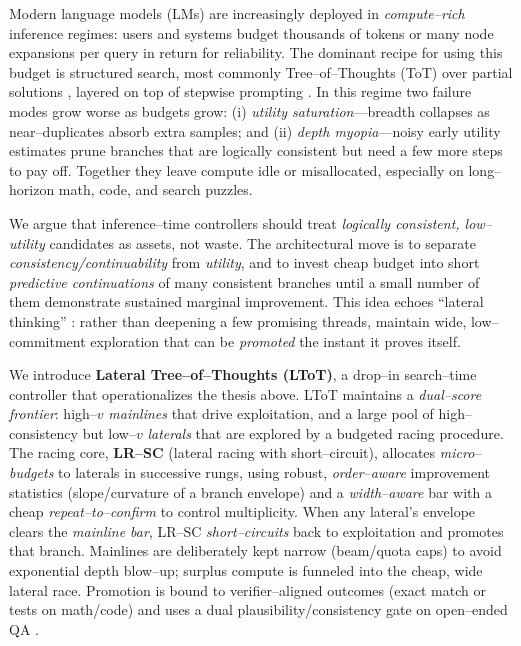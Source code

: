 \documentclass{article}
\begin{document}
Modern language models (LMs) are increasingly deployed in \emph{compute--rich} inference regimes: users and systems budget thousands of tokens or many node expansions per query in return for reliability.
The dominant recipe for using this budget is structured search, most commonly Tree--of--Thoughts (ToT) over partial solutions \citep{yao2023tot}, layered on top of stepwise prompting \citep{wei2022cot,wang2022selfconsistency,kojima2022zeroshotcot}.
In this regime two failure modes grow worse as budgets grow:
(i) \emph{utility saturation}—breadth collapses as near--duplicates absorb extra samples; and
(ii) \emph{depth myopia}—noisy early utility estimates prune branches that are logically consistent but need a few more steps to pay off.
Together they leave compute idle or misallocated, especially on long--horizon math, code, and search puzzles.

We argue that inference--time controllers should treat \emph{logically consistent, low--utility} candidates as assets, not waste.
The architectural move is to separate \emph{consistency/continuability} from \emph{utility}, and to invest cheap budget into short \emph{predictive continuations} of many consistent branches until a small number of them demonstrate sustained marginal improvement.
This idea echoes ``lateral thinking'' \citep{debono1967lateral}: rather than deepening a few promising threads, maintain wide, low--commitment exploration that can be \emph{promoted} the instant it proves itself.

We introduce \textbf{Lateral Tree--of--Thoughts (LToT)}, a drop--in search--time controller that operationalizes the thesis above.
LToT maintains a \emph{dual--score frontier}: high--$v$ \emph{mainlines} that drive exploitation, and a large pool of high--consistency but low--$v$ \emph{laterals} that are explored by a budgeted racing procedure.
The racing core, \textbf{LR--SC} (lateral racing with short--circuit), allocates \emph{micro--budgets} to laterals in successive rungs, using robust, \emph{order--aware} improvement statistics (slope/curvature of a branch envelope) and a \emph{width--aware} bar with a cheap \emph{repeat--to--confirm} to control multiplicity.
When any lateral's envelope clears the \emph{mainline bar}, LR--SC \emph{short--circuits} back to exploitation and promotes that branch.
Mainlines are deliberately kept narrow (beam/quota caps) to avoid exponential depth blow--up; surplus compute is funneled into the cheap, wide lateral race.
Promotion is bound to verifier--aligned outcomes (exact match or tests on math/code) and uses a dual plausibility/consistency gate on open--ended QA \citep{cobbe2021verifiers}.
\end{document}
